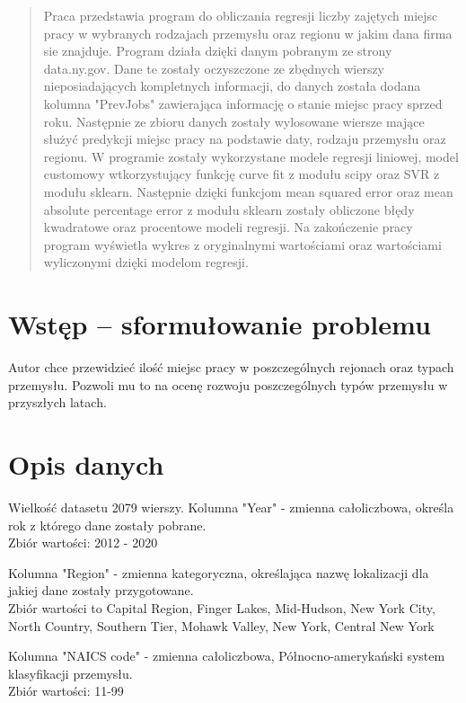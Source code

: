 \documentclass[10pt]{article}
\begin{document}


\begin{abstract}

Praca przedstawia program do obliczania regresji liczby zajętych miejsc pracy w wybranych rodzajach przemysłu oraz regionu w jakim dana firma sie znajduje. Program działa dzięki danym pobranym ze strony data.ny.gov.
Dane te zostały oczyszczone ze zbędnych wierszy nieposiadających kompletnych informacji, do danych została dodana kolumna "PrevJobs" zawierająca informację o stanie miejsc pracy sprzed roku. Następnie ze zbioru danych zostały wylosowane wiersze mające służyć predykcji miejsc pracy na podstawie daty, rodzaju przemysłu oraz regionu. W programie zostały wykorzystane modele regresji liniowej, model customowy wtkorzystujący funkcję curve fit z modułu scipy oraz SVR z modułu sklearn. Następnie dzięki funkcjom mean squared error oraz mean absolute percentage error z modułu sklearn zostały obliczone błędy kwadratowe oraz procentowe modeli regresji. Na zakończenie pracy program wyświetla wykres z oryginalnymi wartościami oraz wartościami wyliczonymi dzięki modelom regresji. 

\end{abstract}

\section{Wstęp -- sformułowanie problemu}
\label{sec:wstep}

Autor chce przewidzieć ilość miejsc pracy w poszczególnych rejonach oraz typach przemysłu. Pozwoli mu to na ocenę rozwoju poszczególnych typów przemysłu w przyszłych latach.

\section{Opis danych}

Wielkość datasetu 2079 wierszy.
    Kolumna "Year" - zmienna całoliczbowa, określa rok z którego dane zostały pobrane.\\
    Zbiór wartości: 2012 - 2020
    
    Kolumna "Region" - zmienna kategoryczna, określająca nazwę lokalizacji dla jakiej dane zostały przygotowane.\\
    Zbiór wartości to Capital Region, Finger Lakes, Mid-Hudson, New York City, North Country, Southern Tier, Mohawk Valley, New York, Central New York
    
    Kolumna "NAICS code" - zmienna całoliczbowa, Północno-amerykański system klasyfikacji przemysłu.\\
    Zbiór wartości: 11-99
    
\end{document}
